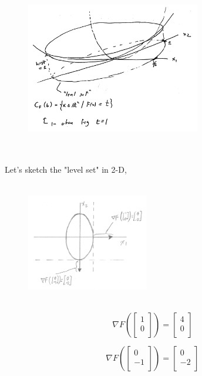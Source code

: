 \begin{figure}
	\centering
	\includegraphics[width=3in,height=3in]{figures/ch02/p59.jpg}
\end{figure}

Let's sketch the "level set" in 2-D, 

\begin{figure}
	\centering
	\includegraphics[width=2.1in,height=2.1in]{figures/ch02/p60-1.jpg}
\end{figure}

\begin{displaymath}
\nabla F \left( \begin{bmatrix} 1\\ 0\\ \end{bmatrix} \right)  =
\begin{bmatrix} 4\\ 0\\ \end{bmatrix}
\end{displaymath}

\begin{displaymath}
\nabla F \left( \begin{bmatrix} 0\\ -1\\ \end{bmatrix} \right)  =
\begin{bmatrix} 0\\ -2\\ \end{bmatrix}
\end{displaymath}

